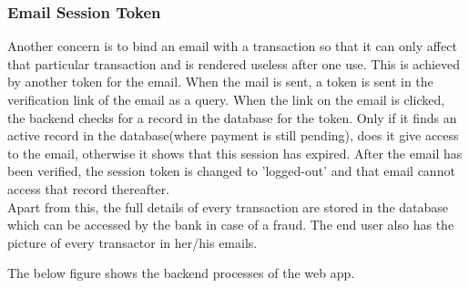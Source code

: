 \documentclass[12pt, oneside, a4paper]{article}
\begin{document}
\subsubsection{Email Session Token}
Another concern is to bind an email with a transaction so that it can only affect that particular transaction and is rendered useless after one use. This is achieved by another token for the email. When the mail is sent, a token is sent in the verification link of the email as a query. When the link on the email is clicked, the backend checks for a record in the database for the token. Only if it finds an active record in the database(where payment is still pending), does it give access to the email, otherwise it shows that this session has expired. After the email has been verified, the session token is changed to 'logged-out' and that email cannot access that record thereafter.\\

Apart from this, the full details of every transaction are stored in the database which can be accessed by the bank in case of a fraud. The end user also has the picture of every transactor in her/his emails.

\pagebreak

\begin{center}

\vspace{1cm}
The below figure shows the backend processes of the web app.
\end{center}
\end{document}
